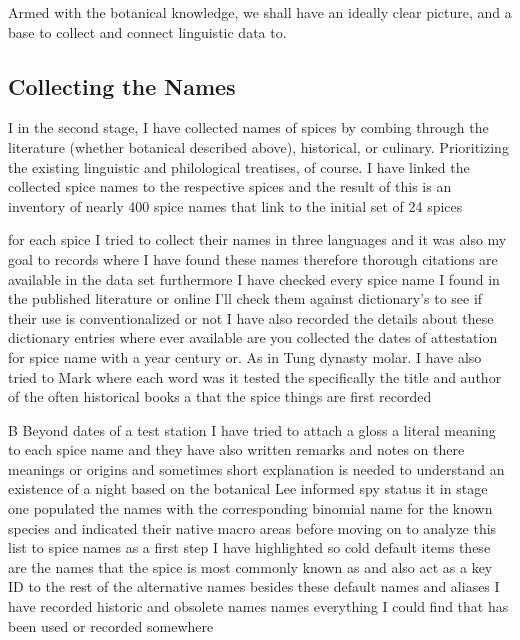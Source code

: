 
Armed with the botanical knowledge, we shall have an ideally clear picture, and a base to collect and connect linguistic data to.



\subsection{Collecting the Names}

I in the second stage, I have collected names of spices by combing through the literature (whether botanical described above), historical, or culinary. Prioritizing the existing linguistic and philological treatises, of course. I have linked the collected spice names to the respective spices and the result of this is an inventory of nearly 400 spice names that link to the initial set of 24 spices
  
    for each spice I tried to collect their names in three languages and it was also my goal to records where I have found these names therefore thorough citations are available in the data set furthermore I have checked every spice name I found in the published literature or online I'll check them against dictionary's to see if their use is conventionalized or not   I have also recorded the details about these dictionary entries where ever available are you collected the dates of attestation for spice name with a year century or. As in Tung dynasty molar. I have also tried to Mark where each word was it tested the specifically the title and author of the often historical books  a that the spice things are first recorded 

 B Beyond dates of a test station I have tried to attach a gloss a literal meaning to each spice name and they have also written remarks and notes on there meanings or origins and sometimes short explanation is needed to understand an existence of a night based on the botanical Lee informed spy status it in stage one populated the names with the corresponding   binomial name for the known species and indicated their native macro areas before moving on to analyze this list to spice names as a first step I have highlighted so cold default items these are the names that the spice is most commonly known as and also act as a key ID   to the rest of the alternative names besides these default names and aliases I have recorded historic and obsolete names names everything I could find that has been used or recorded somewhere 
 
